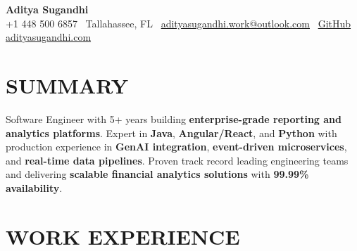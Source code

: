 \documentclass[letterpaper,10pt]{article}
\begin{document}
\begin{center}
{\huge\textbf{Aditya Sugandhi}} \\
+1 448 500 6857 \textbar\ \textcolor{metablue}{Tallahassee, FL} \textbar\
\href{mailto:adityasugandhi.work@outlook.com}{adityasugandhi.work@outlook.com} \textbar\
\href{https://github.com/adityasugandhi}{GitHub}
\textbar \href{https://adityasugandhi.com}{adityasugandhi.com}
\end{center}
\vspace{-12pt}

\section{\textcolor{metablue}{SUMMARY}}
\small
\vspace{-6pt}
Software Engineer with 5+ years building \textbf{enterprise-grade reporting and analytics platforms}. Expert in \textbf{Java}, \textbf{Angular/React}, and \textbf{Python} with production experience in \textbf{GenAI integration}, \textbf{event-driven microservices}, and \textbf{real-time data pipelines}. Proven track record leading engineering teams and delivering \textbf{scalable financial analytics solutions} with \textbf{99.99\% availability}.

\vspace{-9pt}

\section{\textcolor{metablue}{WORK EXPERIENCE}}
\vspace{-10pt}
\end{document}
